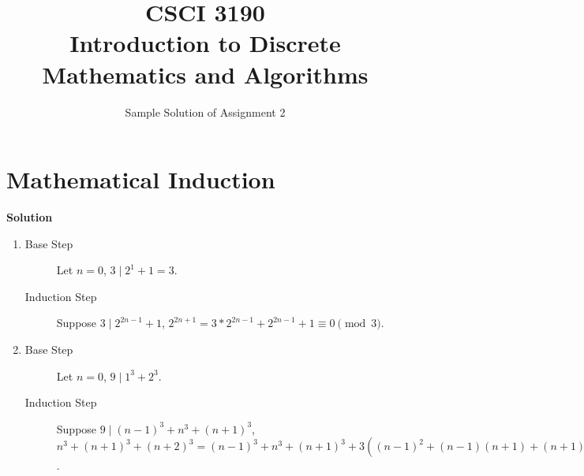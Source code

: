 \documentclass{../../cls/sig-alternate-05-2015}
\begin{document}






%

\title{CSCI 3190 \\ Introduction to Discrete Mathematics and Algorithms}
\subtitle{Sample Solution of Assignment 2}

\maketitle
\begin{abstract}

\end{abstract}

\keywords{}

\section{Mathematical Induction}
\textbf{Solution}\begin{enumerate}[label=(\alph*)]
	\item \begin{description}
		\item[Base Step] Let $n = 0$, $3 \mid 2^1 + 1 = 3$.
		\item[Induction Step] Suppose $3 \mid 2^{2n - 1} + 1$, $2^{2n + 1} = 3 * 2^{2n - 1} + 2^{2n - 1} + 1 \equiv 0 \pmod{3}$.
	\end{description}
	\item \begin{description}
		\item[Base Step] Let $n = 0$, $9 \mid 1^3 + 2^3$.
		\item[Induction Step] Suppose $9 \mid (n - 1)^3 + n^3 + (n + 1)^3$, $n^3 + (n + 1)^3 + (n + 2)^3 = (n - 1)^3 + n^3 + (n + 1)^3 + 3((n - 1)^2 + (n - 1)(n + 1) + (n + 1)^2) \equiv 0 \pmod{3}$.
	\end{description}
\end{enumerate}
\end{document}
